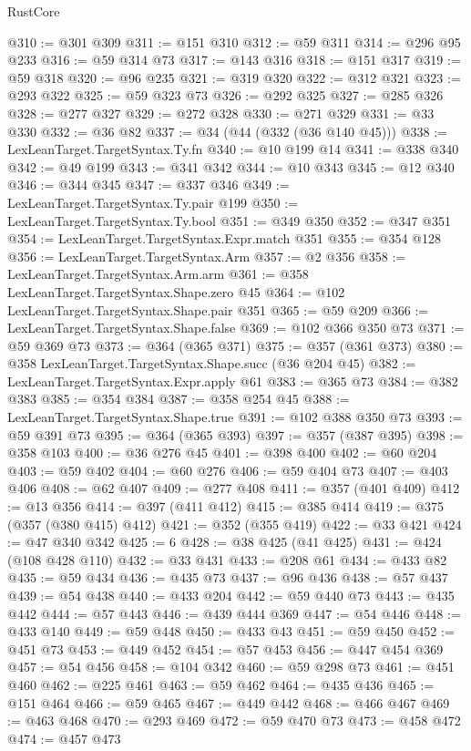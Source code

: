 \begin{lexlean}{RustCore}
\begin{coremodule}
@310 := @301 @309
@311 := @151 @310
@312 := @59 @311
@314 := @296 @95 @233
@316 := @59 @314 @73
@317 := @143 @316
@318 := @151 @317
@319 := @59 @318
@320 := @96 @235
@321 := @319 @320
@322 := @312 @321
@323 := @293 @322
@325 := @59 @323 @73
@326 := @292 @325
@327 := @285 @326
@328 := @277 @327
@329 := @272 @328
@330 := @271 @329
@331 := @33 @330
@332 := @36 @82
@337 := @34 (@44 (@332 (@36 @140 @45)))
@338 := LexLeanTarget.TargetSyntax.Ty.fn
@340 := @10 @199 @14
@341 := @338 @340
@342 := @49 @199
@343 := @341 @342
@344 := @10 @343
@345 := @12 @340
@346 := @344 @345
@347 := @337 @346
@349 := LexLeanTarget.TargetSyntax.Ty.pair @199
@350 := LexLeanTarget.TargetSyntax.Ty.bool
@351 := @349 @350
@352 := @347 @351
@354 := LexLeanTarget.TargetSyntax.Expr.match @351
@355 := @354 @128
@356 := LexLeanTarget.TargetSyntax.Arm
@357 := @2 @356
@358 := LexLeanTarget.TargetSyntax.Arm.arm
@361 := @358 LexLeanTarget.TargetSyntax.Shape.zero @45
@364 := @102 LexLeanTarget.TargetSyntax.Shape.pair @351
@365 := @59 @209
@366 := LexLeanTarget.TargetSyntax.Shape.false
@369 := @102 @366 @350 @73
@371 := @59 @369 @73
@373 := @364 (@365 @371)
@375 := @357 (@361 @373)
@380 := @358 LexLeanTarget.TargetSyntax.Shape.succ (@36 @204 @45)
@382 := LexLeanTarget.TargetSyntax.Expr.apply @61
@383 := @365 @73
@384 := @382 @383
@385 := @354 @384
@387 := @358 @254 @45
@388 := LexLeanTarget.TargetSyntax.Shape.true
@391 := @102 @388 @350 @73
@393 := @59 @391 @73
@395 := @364 (@365 @393)
@397 := @357 (@387 @395)
@398 := @358 @103
@400 := @36 @276 @45
@401 := @398 @400
@402 := @60 @204
@403 := @59 @402
@404 := @60 @276
@406 := @59 @404 @73
@407 := @403 @406
@408 := @62 @407
@409 := @277 @408
@411 := @357 (@401 @409)
@412 := @13 @356
@414 := @397 (@411 @412)
@415 := @385 @414
@419 := @375 (@357 (@380 @415) @412)
@421 := @352 (@355 @419)
@422 := @33 @421
@424 := @47 @340 @342
@425 := 6
@428 := @38 @425 (@41 @425)
@431 := @424 (@108 @428 @110)
@432 := @33 @431
@433 := @208 @61
@434 := @433 @82
@435 := @59 @434
@436 := @435 @73
@437 := @96 @436
@438 := @57 @437
@439 := @54 @438
@440 := @433 @204
@442 := @59 @440 @73
@443 := @435 @442
@444 := @57 @443
@446 := @439 @444 @369
@447 := @54 @446
@448 := @433 @140
@449 := @59 @448
@450 := @433 @43
@451 := @59 @450
@452 := @451 @73
@453 := @449 @452
@454 := @57 @453
@456 := @447 @454 @369
@457 := @54 @456
@458 := @104 @342
@460 := @59 @298 @73
@461 := @451 @460
@462 := @225 @461
@463 := @59 @462
@464 := @435 @436
@465 := @151 @464
@466 := @59 @465
@467 := @449 @442
@468 := @466 @467
@469 := @463 @468
@470 := @293 @469
@472 := @59 @470 @73
@473 := @458 @472
@474 := @457 @473

\end{coremodule}
\end{lexlean}
